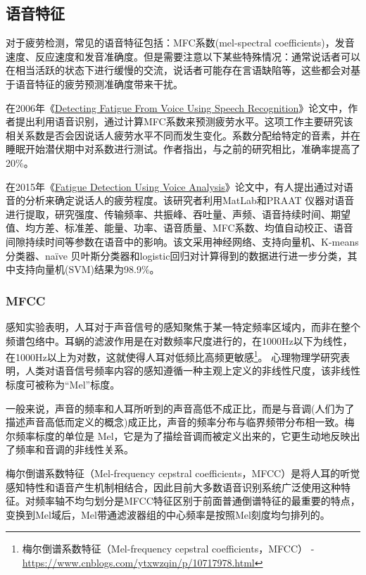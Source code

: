 \subsection{语音特征}

对于疲劳检测，常见的语音特征包括：MFC系数(mel-spectral coefficients)，发音速度、反应速度和发音准确度。但是需要注意以下某些特殊情况：通常说话者可以在相当活跃的状态下进行缓慢的交流，说话者可能存在言语缺陷等，这些都会对基于语音特征的疲劳预测准确度带来干扰。

在2006年《\href{https://xueshu.baidu.com/usercenter/paper/show?paperid=7e674fe5eb722228c0d9e0bcc5188b55&site=xueshu_se}{Detecting Fatigue From Voice Using Speech Recognition}》论文中，作者提出利用语音识别，通过计算MFC系数来预测疲劳水平。这项工作主要研究该相关系数是否会因说话人疲劳水平不同而发生变化。系数分配给特定的音素，并在睡眠开始潜伏期中对系数进行测试。作者指出，与之前的研究相比，准确率提高了20$\%$。

在2015年《\href{https://xueshu.baidu.com/usercenter/paper/show?paperid=3c1f7acf94bff8e975cf6838f7e53a74&site=xueshu_se&hitarticle=1}{Fatigue Detection Using Voice Analysis}》论文中，有人提出通过对语音的分析来确定说话人的疲劳程度。该研究者利用MatLab和PRAAT 仪器对语音进行提取，研究强度、传输频率、共振峰、吞吐量、声频、语音持续时间、期望值、均方差、标准差、能量、功率、语音质量、MFC系数、均值自动校正、语音间隙持续时间等参数在语音中的影响。该文采用神经网络、支持向量机、K-means 分类器、naïve 贝叶斯分类器和logistic回归对计算得到的数据进行进一步分类，其中支持向量机(SVM)结果为98.9$\%$。

\subsubsection{MFCC}

感知实验表明，人耳对于声音信号的感知聚焦于某一特定频率区域内，而非在整个频谱包络中。耳蜗的滤波作用是在对数频率尺度进行的，在1000Hz以下为线性，在1000Hz以上为对数，这就使得人耳对低频比高频更敏感\footnote{梅尔倒谱系数特征（Mel-frequency cepstral coefficients，MFCC） - \url{https://www.cnblogs.com/ytxwzqin/p/10717978.html}}。 心理物理学研究表明，人类对语音信号频率内容的感知遵循一种主观上定义的非线性尺度，该非线性标度可被称为“Mel”标度。

一般来说，声音的频率和人耳所听到的声音高低不成正比，而是与音调(人们为了描述声音高低而定义的概念)成正比，声音的频率分布与临界频带分布相一致。梅尔频率标度的单位是 Mel，它是为了描绘音调而被定义出来的，它更生动地反映出了频率和音调的非线性关系。

梅尔倒谱系数特征（Mel-frequency cepstral coefficients，MFCC）是将人耳的听觉感知特性和语音产生机制相结合，因此目前大多数语音识别系统广泛使用这种特征。对频率轴不均匀划分是MFCC特征区别于前面普通倒谱特征的最重要的特点，变换到Mel域后，Mel带通滤波器组的中心频率是按照Mel刻度均匀排列的。

